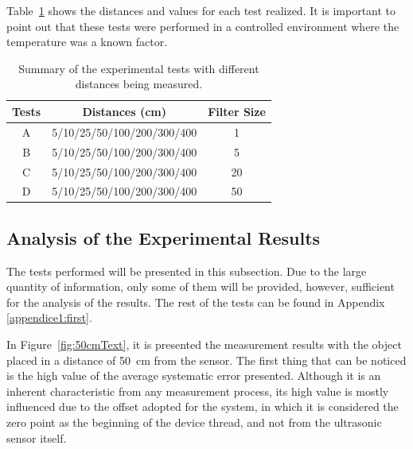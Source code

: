 Table~\ref{table:testSummary} shows the distances and values for each test realized. It is important to point out that these tests were performed in a controlled environment where the temperature was a known factor. 

\begin{table}[h!]
    \centering
    \begin{tabular}{@{}ccc@{}}
        \toprule
        \textbf{Tests} & \textbf{Distances (cm)} & \textbf{Filter Size} \\ \midrule
        \rowcolor[HTML]{EFEFEF} 
        A & 5/10/25/50/100/200/300/400 & 1 \\
        B & 5/10/25/50/100/200/300/400 & 5 \\
        \rowcolor[HTML]{EFEFEF} 
        C & 5/10/25/50/100/200/300/400 & 20 \\ 
        D & 5/10/25/50/100/200/300/400 & 50 \\ \bottomrule
    \end{tabular}
    \caption{Summary of the experimental tests with different distances being measured.}
    \label{table:testSummary}
\end{table}


\subsection{Analysis of the Experimental Results}

The tests performed will be presented in this subsection. Due to the large quantity of information, only some of them will be provided, however, sufficient for the analysis of the results. The rest of the tests can be found in Appendix \ref{appendice1:first}.

In Figure~\ref{fig:50cmText}, it is presented the measurement results with the object placed in a distance of 50~cm from the sensor. The first thing that can be noticed is the high value of the average systematic error presented. Although it is an inherent characteristic from any measurement process, its high value is mostly influenced due to the offset adopted for the system, in which it is considered the zero point as the beginning of the device thread, and not from the ultrasonic sensor itself.


